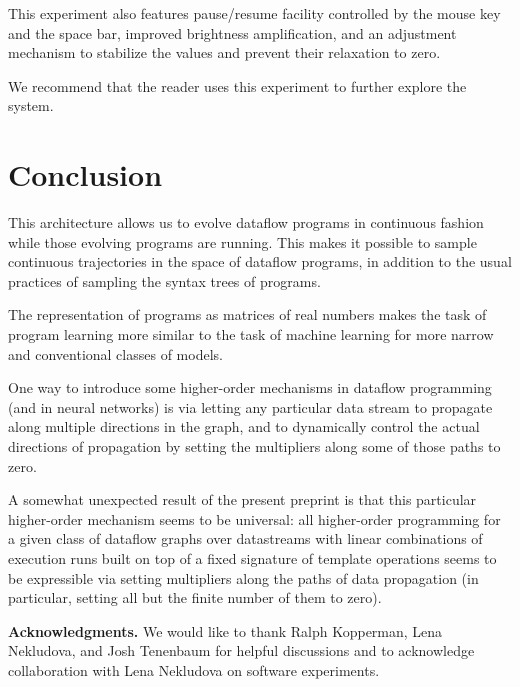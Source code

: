 \documentclass[withtimes]{easychair}
\begin{document}
This experiment also features pause/resume facility controlled by the mouse key and the
space bar, improved brightness amplification, and an adjustment mechanism to stabilize the values
and prevent their relaxation to zero.

We recommend that the reader uses this experiment to further explore the system.

\section{Conclusion}


This architecture allows us to evolve dataflow programs in continuous fashion while those evolving programs
are running. This makes it possible to sample continuous trajectories in the space of
dataflow programs, in addition to the usual practices of sampling the syntax trees of programs.

The representation of programs as matrices of real numbers makes the task of program
learning more similar to the task of machine learning for more narrow and conventional
classes of models.

One way to introduce some higher-order mechanisms in dataflow programming (and in neural
networks) is via letting any particular data stream to propagate along multiple directions in the
graph, and to dynamically control the actual directions of propagation by setting the
multipliers along some of those paths to zero.

A somewhat unexpected result of the present preprint is that this particular higher-order
mechanism seems to be universal: all higher-order programming for a given class
of dataflow graphs over datastreams with linear combinations of execution runs built on top of a fixed
signature of template operations seems to be expressible via setting multipliers
along the paths of data propagation (in particular, setting all but the finite number of them
to zero).

{\bf Acknowledgments.} We would like to thank Ralph Kopperman, Lena Nekludova, and Josh Tenenbaum for helpful discussions and
to acknowledge collaboration with Lena Nekludova on software experiments.

\label{sect:bib}


\end{document}

